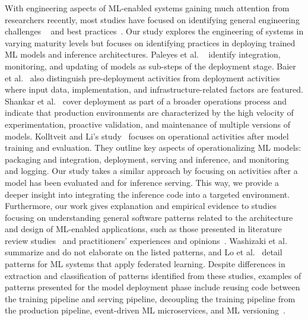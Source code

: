 With engineering aspects of ML-enabled systems gaining much attention from researchers recently, most studies have focused on identifying general engineering challenges ~\cite{lwakatare2019taxonomy, paleyes2022challenges, giray2021software, martinez2022software, baier2019challenges} and best practices~\cite{serban}. Our study explores the engineering of \DIFdelbegin {}\DIFdelend \DIFaddbegin {}\DIFaddend systems in varying maturity levels but focuses on identifying \DIFdelbegin {}\DIFdelend \DIFaddbegin {}\DIFaddend practices in deploying trained ML models %
and inference architectures. Paleyes et al. ~\cite{paleyes2022challenges} identify integration, monitoring, and updating of models as sub-steps of the deployment stage. Baier et al.~\cite{baier2019challenges} also distinguish pre-deployment activities from deployment activities where input data, implementation, and infrastructure-related factors are featured. Shankar et al.~\cite{shankar2022operationalizing} cover deployment as part of a broader operations process and indicate that production environments are characterized by the high velocity of experimentation, proactive validation, and maintenance of multiple versions of models. Kolltveit and Li's study~\cite{kolltveit2022operationalizing} focuses on operational activities after model training and evaluation. They outline key aspects of operationalizing ML models: packaging and integration, deployment, serving and inference, and monitoring and logging. Our study takes a similar approach by focusing on activities after a model has been evaluated and \DIFdelbegin {}\DIFdelend \DIFaddbegin {}\DIFaddend for inference serving. This way, we provide a deeper insight into integrating the inference code into a targeted environment.
Furthermore, our work gives explanation and empirical evidence to studies focusing on understanding general software patterns related to the architecture and design of ML-enabled applications, such as those presented in literature review studies~\cite{washizaki, Lo, heiland2023design} and practitioners' experiences and opinions~\cite{lakshmanan2020machine, take}. Washizaki et al.~\cite{washizaki} summarize and do not elaborate on the listed patterns, and Lo et al.~\cite{Lo} detail patterns for ML systems that apply federated learning. Despite differences in extraction and classification of patterns identified from these studies, examples of patterns presented for the model deployment phase include reusing code between the training pipeline and serving pipeline, decoupling the training pipeline from the production pipeline, event-driven ML microservices, and ML versioning~\cite{washizaki}. %
